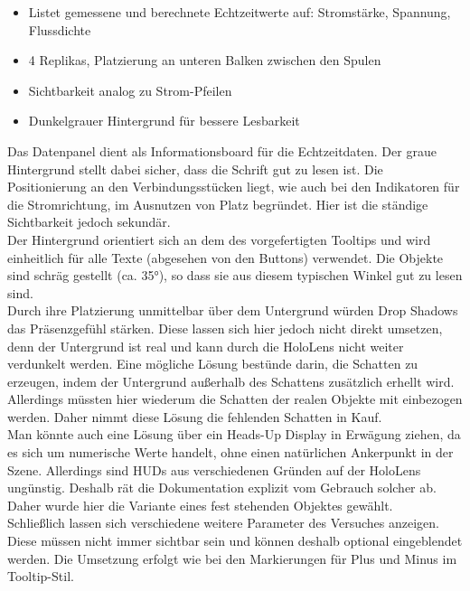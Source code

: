 \begin{itemize}[rightmargin=12px, topsep=-12px]
	\setlength{\itemsep}{-1pt}
	\singlespacing
	\item Listet gemessene und berechnete Echtzeitwerte auf: Stromstärke, Spannung, Flussdichte
	\item 4 Replikas, Platzierung an unteren Balken zwischen den Spulen
	\item Sichtbarkeit analog zu Strom-Pfeilen
	\item Dunkelgrauer Hintergrund für bessere Lesbarkeit
\end{itemize}

Das Datenpanel dient als Informationsboard für die Echtzeitdaten. Der graue Hintergrund stellt dabei sicher, dass die Schrift gut zu lesen ist. Die Positionierung an den Verbindungsstücken liegt, wie auch bei den Indikatoren für die Stromrichtung, im Ausnutzen von Platz begründet. Hier ist die ständige Sichtbarkeit jedoch sekundär.\\

Der Hintergrund orientiert sich an dem des vorgefertigten Tooltips und wird einheitlich für alle Texte (abgesehen von den Buttons) verwendet. Die Objekte sind schräg gestellt (ca. 35°), so dass sie aus diesem typischen Winkel gut zu lesen sind.\\

Durch ihre Platzierung unmittelbar über dem Untergrund würden Drop Shadows das Präsenzgefühl stärken. Diese lassen sich hier jedoch nicht direkt umsetzen, denn der Untergrund ist real und kann durch die HoloLens nicht weiter verdunkelt werden. Eine mögliche Lösung bestünde darin, die Schatten zu erzeugen, indem der Untergrund außerhalb des Schattens zusätzlich erhellt wird. Allerdings müssten hier wiederum die Schatten der realen Objekte mit einbezogen werden. Daher nimmt diese Lösung die fehlenden Schatten in Kauf.\\

Man könnte auch eine Lösung über ein Heads-Up Display in Erwägung ziehen, da es sich um numerische Werte handelt, ohne einen natürlichen Ankerpunkt in der Szene. Allerdings sind HUDs aus verschiedenen Gründen auf der HoloLens ungünstig. Deshalb rät die Dokumentation explizit vom Gebrauch solcher ab. Daher wurde hier die Variante eines fest stehenden Objektes gewählt.\\

Schließlich lassen sich verschiedene weitere Parameter des Versuches anzeigen. Diese müssen nicht immer sichtbar sein und können deshalb optional eingeblendet werden. Die Umsetzung erfolgt wie bei den Markierungen für Plus und Minus im Tooltip-Stil.\\

